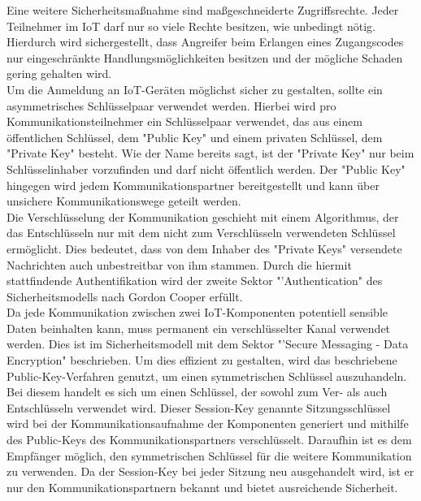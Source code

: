 Eine weitere Sicherheitsmaßnahme sind maßgeschneiderte Zugriffsrechte. Jeder Teilnehmer im \ac{IoT} darf nur so viele Rechte besitzen, wie unbedingt nötig. Hierdurch wird sichergestellt, dass Angreifer beim Erlangen eines Zugangscodes nur eingeschränkte Handlungsmöglichkeiten besitzen und der mögliche Schaden gering gehalten wird.\\

Um die Anmeldung an \ac{IoT}-Geräten möglichst sicher zu gestalten, sollte ein asymmetrisches Schlüsselpaar verwendet werden. Hierbei wird pro Kommunikationsteilnehmer ein Schlüsselpaar verwendet, das aus einem öffentlichen Schlüssel, dem "Public Key" und einem privaten Schlüssel, dem "Private Key" besteht. Wie der Name bereits sagt, ist der "Private Key" nur beim Schlüsselinhaber vorzufinden und darf nicht öffentlich werden. Der "Public Key" hingegen wird jedem Kommunikationspartner bereitgestellt und kann über unsichere Kommunikationswege geteilt werden.\\

Die Verschlüsselung der Kommunikation geschieht mit einem Algorithmus, der das Entschlüsseln nur mit dem nicht zum Verschlüsseln verwendeten Schlüssel ermöglicht. Dies bedeutet, dass von dem Inhaber des "Private Keys" versendete Nachrichten auch unbestreitbar von ihm stammen. Durch die hiermit stattfindende Authentifikation wird der zweite Sektor "'Authentication" des Sicherheitsmodells nach Gordon Cooper erfüllt.\\

Da jede Kommunikation zwischen zwei \ac{IoT}-Komponenten potentiell sensible Daten beinhalten kann, muss permanent ein verschlüsselter Kanal verwendet werden. Dies ist im Sicherheitsmodell mit dem Sektor "'Secure Messaging - Data Encryption" beschrieben. Um dies effizient zu gestalten, wird das beschriebene Public-Key-Verfahren genutzt, um einen symmetrischen Schlüssel auszuhandeln. Bei diesem handelt es sich um einen Schlüssel, der sowohl zum Ver- als auch Entschlüsseln verwendet wird. Dieser Session-Key genannte Sitzungsschlüssel wird bei der Kommunikationsaufnahme der Komponenten generiert und mithilfe des Public-Keys des Kommunikationspartners verschlüsselt. Daraufhin ist es dem Empfänger möglich, den symmetrischen Schlüssel für die weitere Kommunikation zu verwenden. Da der Session-Key bei jeder Sitzung neu ausgehandelt wird, ist er nur den Kommunikationspartnern bekannt und bietet ausreichende Sicherheit.\\